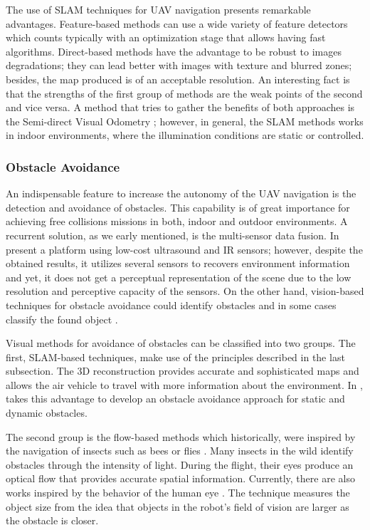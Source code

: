 The use of SLAM techniques for UAV navigation presents remarkable advantages. Feature-based methods can use a wide variety of feature detectors which counts typically with an optimization stage that allows having fast algorithms. Direct-based methods have the advantage to be robust to images degradations; they can lead better with images with texture and blurred zones; besides, the map produced is of an acceptable resolution. An interesting fact is that the strengths of the first group of methods are the weak points of the second and vice versa. A method that tries to gather the benefits of both approaches is the Semi-direct Visual Odometry \cite{Forster.Pizzoli.ea:ICRA:2014}; however, in general, the SLAM methods works in indoor environments, where the illumination conditions are static or controlled.\\

\subsubsection{Obstacle Avoidance}

An indispensable feature to increase the autonomy of the UAV navigation is the detection and avoidance of obstacles. This capability is of great importance for achieving free collisions missions in both, indoor and outdoor environments. A recurrent solution, as we early mentioned, is the multi-sensor data fusion. In \cite{Gageik.Benz.ea:ACCESS:2015} present a platform using low-cost ultrasound and IR sensors; however, despite the obtained results, it utilizes several sensors to recovers environment information and yet, it does not get a perceptual representation of the scene due to the low resolution and perceptive capacity of the sensors. On the other hand, vision-based techniques for obstacle avoidance could identify obstacles and in some cases classify the found object \cite{Li.Ye.ea:IROS:2016}. 

Visual methods for avoidance of obstacles can be classified into two groups. The first, SLAM-based techniques, make use of the principles described in the last subsection. The 3D reconstruction provides accurate and sophisticated maps and allows the air vehicle to travel with more information about the environment. In \cite{Moreno-Armendariz.Calvo:ICMEAE:2014}, takes this advantage to develop an obstacle avoidance approach for static and dynamic obstacles. 

The second group is the flow-based methods which historically, were inspired by the navigation of insects such as bees \cite{Srinivasan.Gregory:PTBS:1992} or flies \cite{Franceschini.Ruffier.ea:InTech:2012}. Many insects in the wild identify obstacles through the intensity of light. During the flight, their eyes produce an optical flow that provides accurate spatial information. Currently, there are also works inspired by the behavior of the human eye \cite{Al-Kaff.Meng.ea:IVS:2016}. The technique measures the object size from the idea that objects in the robot's field of vision are larger as the obstacle is closer.\\

